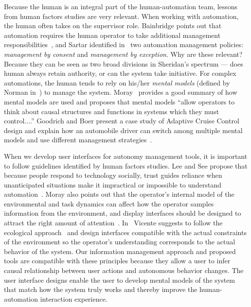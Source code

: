 Because the human is an integral part of the human-automation team, lessons from human factors studies are very relevant. When working with automation, the human often takes on the supervisor role. Bainbridge points out that automation requires the human operator to take additional management responsibilities~\cite{Bainbridge1983Ironies}, and Sartar identified in~\cite{Sarter1998Making} two automation management policies: \textit{management by consent} and \textit{management by exception}. Why are these relevant? Because they can be seen as two broad divisions in Sheridan's spectrum --- does human always retain authority, or can the system take initiative. For complex automations, the human tends to rely on his/her \textit{mental models} (defined by Norman in~\cite{Norman1983Some}) to manage the system. Moray~\cite{Moray1999Mental} provides a good summary of how mental models are used and proposes that mental models ``allow operators to think about causal structures and functions in systems which they must control....'' Goodrich and Boer present a case study of Adaptive Cruise Control design and explain how an automobile driver can switch among multiple mental models and use different management strategies~\cite{Goodrich2002Multiple, Goodrich2003Model}. 

When we develop user interfaces for autonomy management tools, it is important to follow guidelines identified by human factors studies. Lee and See propose that because people respond to technology socially, trust guides reliance when unanticipated situations make it impractical or impossible to understand automation~\cite{Lee2004Trust}. Moray also points out that the operator's internal model of the environmental and task dynamics can affect how the operator samples information from the environment, and display interfaces should be designed to attract the right amount of attention~\cite{Moray1990Designing}. In~\cite{Vicente1997Should} Vicente suggests to follow the ecological approach~\cite{Rasmussen1994Cognitive} and design interfaces compatible with the actual constraints of the environment so the operator's understanding corresponds to the actual behavior of the system. Our information management approach and proposed tools are compatible with these principles because they allow a user to infer causal relationship between user actions and autonomous behavior changes. The user interface designs enable the user to develop mental models of the system that match how the system truly works and thereby improve the human-automation interaction experience.

